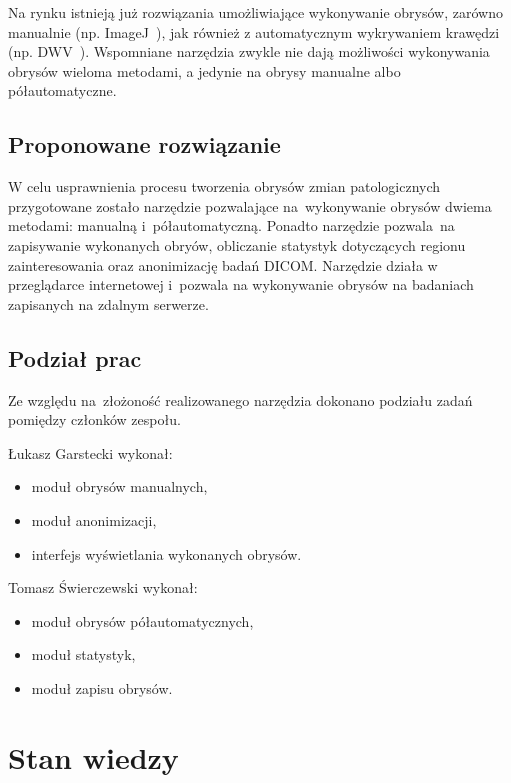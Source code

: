 \documentclass[a4paper,11pt,twoside,openright]{report}
\newcommand\blankpage{%
    \null
    \thispagestyle{empty}%
    \newpage}
\theoremstyle{definition}
\begin{document}
Na rynku istnieją już rozwiązania umożliwiające wykonywanie obrysów,
zarówno manualnie (np. ImageJ~\cite{ImageJ}), jak również z automatycznym wykrywaniem krawędzi (np. DWV~\cite{DWV}).
Wspomniane narzędzia zwykle nie dają możliwości wykonywania obrysów wieloma metodami,
a jedynie na obrysy manualne albo półautomatyczne.

\section {Proponowane rozwiązanie}

W celu usprawnienia procesu tworzenia obrysów zmian patologicznych przygotowane
zostało narzędzie pozwalające na~wykonywanie obrysów dwiema metodami:
manualną i~półautomatyczną. Ponadto narzędzie pozwala~na zapisywanie wykonanych obryów,
obliczanie statystyk dotyczących regionu zainteresowania oraz anonimizację badań DICOM.
Narzędzie działa w przeglądarce internetowej i~pozwala na wykonywanie obrysów na badaniach
zapisanych na zdalnym serwerze.

\section {Podział prac}

Ze względu na~złożoność realizowanego narzędzia dokonano podziału zadań pomiędzy
członków zespołu.

Łukasz Garstecki wykonał:

\begin{itemize}[noitemsep]
	\item moduł obrysów manualnych,
	\item moduł anonimizacji,
	\item interfejs wyświetlania wykonanych obrysów.
\end{itemize}

\pagebreak

Tomasz Świerczewski wykonał:

\begin{itemize}[noitemsep]
\item moduł obrysów półautomatycznych,
\item moduł statystyk,
\item moduł zapisu obrysów.
\end{itemize}

\afterpage{\blankpage}

\chapter {Stan wiedzy}
\end{document}
